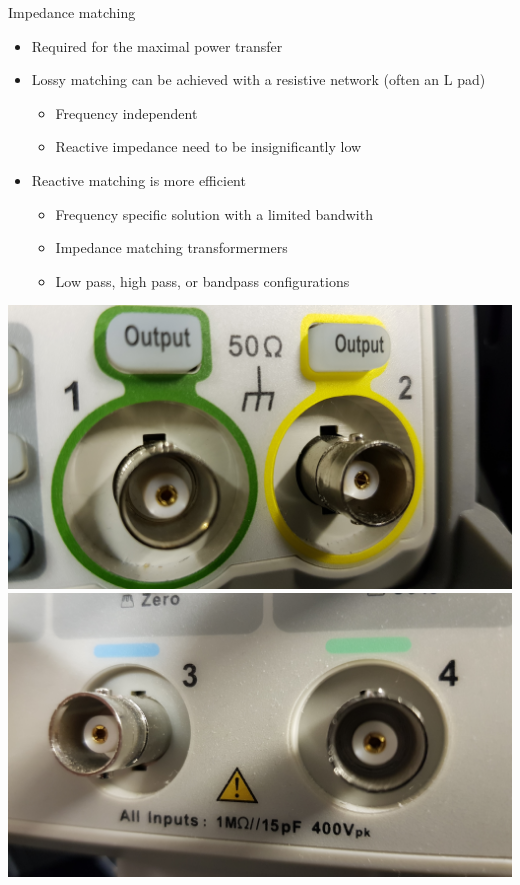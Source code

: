 \documentclass{beamer}
\begin{document}
\begin{frame}[label=impedance_matching]{Impedance matching}
\begin{itemize}
 \item Required for the maximal power transfer
 \item Lossy matching can be achieved with a resistive network (often an L pad)
  \begin{itemize}
   \item Frequency independent
   \item Reactive impedance need to be insignificantly low
  \end{itemize}
 \item Reactive matching is more efficient
  \begin{itemize}
   \item Frequency specific solution with a limited bandwith
   \item Impedance matching transformermers
   \item Low pass, high pass, or bandpass configurations
  \end{itemize}
\end{itemize}
\includegraphics[width=0.4\linewidth]{coaxial_out.jpg}
\includegraphics[width=0.4\linewidth]{coaxial_in.jpg}
\end{frame}
\end{document}
